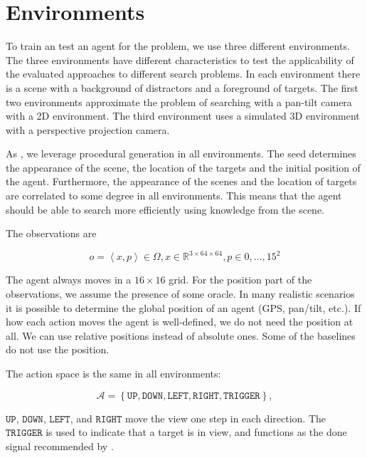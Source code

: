 \section{Environments}
\label{sec:environments}

To train an test an agent for the problem, we use three different environments.
The three environments have different characteristics to test the applicability of the evaluated approaches to different search problems.
In each environment there is a scene with a background of distractors and a foreground of targets.
The first two environments approximate the problem of searching with a pan-tilt camera with a 2D environment.
The third environment uses a simulated 3D environment with a perspective projection camera. 

As \cite{cobbe_procgen_2020,mnih_asynchronous_2016}, we leverage procedural generation in all environments.
The seed determines the appearance of the scene, the location of the targets and the initial position of the agent.
Furthermore, the appearance of the scenes and the location of targets are correlated to some degree in all environments.
This means that the agent should be able to search more efficiently using knowledge from the scene.

The observations are

\[
    o = \left\langle x, p \right\rangle \in \Omega, x \in \mathbb{R}^{3 \times 64 \times 64}, p \in {0, \dots, 15}^2
\]

The agent always moves in a \(16 \times 16\) grid.
For the position part of the observations, we assume the presence of some oracle.
In many realistic scenarios it is possible to determine the global position of an agent (GPS, pan/tilt, etc.).
If how each action moves the agent is well-defined, we do not need the position at all.
We can use relative positions instead of absolute ones.
Some of the baselines do not use the position.

The action space is the same in all environments:

\[
    \mathcal{A} = \left\lbrace \mathtt{UP}, \mathtt{DOWN}, \mathtt{LEFT}, \mathtt{RIGHT}, \mathtt{TRIGGER} \right\rbrace,
\]

\(\mathtt{UP}\), \(\mathtt{DOWN}\), \(\mathtt{LEFT}\), and \(\mathtt{RIGHT}\) move the view one step in each direction.
The \(\mathtt{TRIGGER}\) is used to indicate that a target is in view, and functions as the done signal recommended by \cite{anderson_evaluation_2018}.


